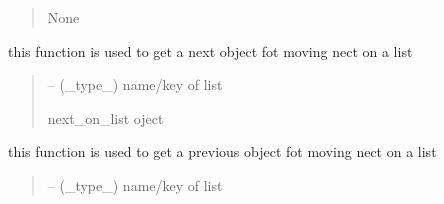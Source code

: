 \documentclass[letterpaper,10pt,english]{sphinxmanual}
\begin{document}
\begin{savenotes}
\begin{fulllineitems}
\begin{savenotes}
\begin{fulllineitems}
\begin{quote}
\begin{description}
\begin{itemize}
\end{itemize}

\sphinxAtStartPar
None

\end{description}\end{quote}

\end{fulllineitems}\end{savenotes}


\begin{savenotes}\begin{fulllineitems}
\label{\detokenize{setting/utils/move_on_list:oxin.utils.move_on_list.moveOnList.build_next_func}}
\pysigstartsignatures
{}
\pysigstopsignatures
\sphinxAtStartPar
this function is used to get a next object fot moving nect on a list
\begin{quote}\begin{description}
\sphinxAtStartPar
{} – (\_type\_) name/key of list

\sphinxAtStartPar
next\_on\_list oject

\end{description}\end{quote}

\end{fulllineitems}\end{savenotes}


\begin{savenotes}\begin{fulllineitems}
\label{\detokenize{setting/utils/move_on_list:oxin.utils.move_on_list.moveOnList.build_prev_func}}
\pysigstartsignatures
{}
\pysigstopsignatures
\sphinxAtStartPar
this function is used to get a previous object fot moving nect on a list
\begin{quote}\begin{description}
\sphinxAtStartPar
{} – (\_type\_) name/key of list


\end{description}
\end{quote}
\end{fulllineitems}
\end{savenotes}
\end{fulllineitems}
\end{savenotes}
\end{document}
